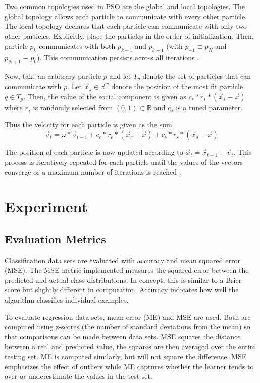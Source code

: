 \documentclass[twoside,11pt]{article}
\newcommand{\Rw}{\mathbb{R}^w }
\begin{document}
	Two common topologies used in PSO are the global and local topologies.
	The global topology allows each particle to communicate with every other particle.
	The local topology declares that each particle can communicate with only two other particles.
	Explicitly, place the particles in the order of initialization.
	Then, particle $p_k$ communicates with both $p_{k-1}$ and $p_{k+1}$ (with $p_{-1} \equiv p_N$ and $p_{N+1} \equiv p_{0}$).
	This communication persists across all iterations \citep{og-pso}.

	Now, take an arbitrary particle $p$ and let $T_p$ denote the set of particles that can communicate with $p$.
	Let $\vec{x}_s \in \Rw$ denote the position of the most fit particle $q \in T_p$. Then, the value of the social component is given as $c_s * r_s * (\vec{x}_s - \vec{x})$ where $r_s$ is randomly selected from $(0,1) \subset \mathbb{R}$ and $c_s$ is a tuned parameter.

	Thus the velocity for each particle is given as the sum
	$$\vec{v}_t = \omega * \vec{v}_{t-1} + c_c*r_c*(\vec{x}_c - \vec{x}) + c_s*r_s*(\vec{x}_s - \vec{x})$$

	The position of each particle is now updated according to $\vec{x}_t = \vec{x}_{t-1} + \vec{v}_t$. This process is iteratively repeated for each particle until the values of the vectors converge or a maximum number of iterations is reached \citep{og-pso}.

\section{Experiment}

\subsection{Evaluation Metrics}

	Classification data sets are evaluated with accuracy and mean squared error (MSE).
	The MSE metric implemented measures the squared error between the predicted and actual class distributions.
	In concept, this is similar to a Brier score but slightly different in computation. Accuracy indicates how well the algorithm classifies individual examples.

	To evaluate regression data sets, mean error (ME) and MSE are used. 
	Both are computed using z-scores (the number of standard deviations from the mean) so that comparisons can be made between data sets.
	MSE squares the distance between a real and predicted value, the squares are then averaged over the entire testing set.
	ME is computed similarly, but will not square the difference. MSE emphasizes the effect of outliers while ME captures whether the learner tends to over or underestimate the values in the test set.
\end{document}
